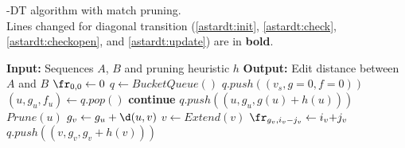 \begin{algorithm}[H]
  \caption{
    \A-DT algorithm with match pruning.\\
    Lines changed for diagonal transition
    (\ref{astardt:init}, \ref{astardt:check}, \ref{astardt:checkopen}, and
    \ref{astardt:update})
    are in \textbf{bold}.
  }%
  \label{alg:astardt}
\fontfamily{\sfdefault}\selectfont
\begin{algorithmic}[1]
\State \textbf{Input:} Sequences $A$, $B$ and
pruning heuristic $h$
\State \textbf{Output:} Edit distance between $A$ and $B$
\boldnext
\State $\fr_{0,0} \gets 0$
\label{astardt:init}
\State $q \gets BucketQueue()$
\State $q.push((v_s, g{=}0, f{=}0))$
\Repeat
  \State $(u, g_u, f_u) \gets q.pop()$
\boldnext
    \label{astardt:check}
    \State \textbf{continue}
    \State $q.push((u, g_u, g(u) + h(u)))$
  \Else
  \State $Prune(u)$
     \State $g_v \gets g_u + \d(u, v)$
     \State $v \gets Extend(v)$
\boldnext
       \label{astardt:checkopen}
\boldnext
       \State $\fr_{g_v,i_v{-}j_v} \gets i_v{+}j_v$
       \label{astardt:update}
       \State $q.push((v, g_v, g_v + h(v)))$
     \EndIf
   \EndFor
   \EndIf
{}
\State {}
\EndFunction
\end{algorithmic}
\end{algorithm}